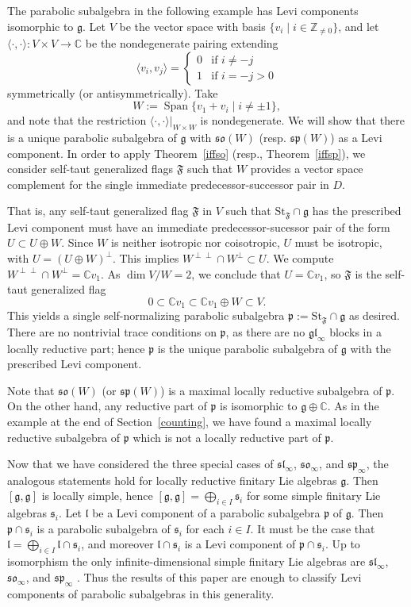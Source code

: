 \documentclass{amsart}
\theoremstyle{definition}
\theoremstyle{remark}
\numberwithin{equation}{section}
\newcommand {\Z} {\mathbb{Z}}
\newcommand {\C} {\mathbb{C}}
\newcommand {\St} {\mathrm{St}}
\def\gl{\mathfrak {gl}}
\def\g{\mathfrak {g}}
\def\l{\mathfrak {l}}
\def\p{\mathfrak {p}}
\def\sl{\mathfrak{sl}}
\def\so{\mathfrak{so}}
\def\sp{\mathfrak{sp}}
\def\s{\mathfrak{s}}
\def\F{\mathfrak{F}}
\newcommand {\Span}{\operatorname{Span}}
\begin{document}
The parabolic subalgebra in the following example has Levi components isomorphic to $\g$. 
Let $V$ be the vector space with basis $\{ v_i \mid  i \in \Z_{\neq 0} \}$, and let $\langle \cdot , \cdot \rangle : V \times V \rightarrow \C$ be the nondegenerate pairing extending
$$\langle v_i , v_j \rangle =
\begin{cases}
 0 & \textrm{if } i \neq -j \\
1 & \textrm{if }  i = -j > 0
\end{cases}$$
symmetrically (or antisymmetrically). Take $$W := \Span \{ v_1 + v_i \mid i \neq \pm 1 \},$$
and note that the restriction $\langle \cdot , \cdot \rangle |_{W \times W}$ is nondegenerate. 
We will show that there is a unique parabolic subalgebra of $\g$ with $\so(W)$ (resp. $\sp(W)$) as a Levi component.  In order to apply Theorem~\ref{iffso} (resp., Theorem~\ref{iffsp}), we consider self-taut generalized flags $\F$ such that $W$ provides a vector space complement for the single immediate predecessor-successor pair in $D$.

That is, any self-taut generalized flag $\F$ in $V$ such that $\St_\F \cap \g$ has the prescribed Levi component must have an immediate predecessor-sucessor pair of the form $U \subset U \oplus W$.  Since $W$ is neither isotropic nor coisotropic, $U$ must be isotropic, with $U = (U \oplus W)^\perp$.  This implies $W^{\perp \perp} \cap W^\perp \subset U$.  We compute $W^{\perp \perp} \cap W^\perp = \C v_1$.  As $\dim V / W = 2$, we conclude that $U = \C v_1$, so $\F$ is the self-taut generalized flag
$$0 \subset \C v_1 \subset \C v_1 \oplus W \subset V.$$ 
This yields a single self-normalizing parabolic subalgebra $\p := \St_\F \cap \g$ as desired.  There are no nontrivial trace conditions on $\p$, as there are no $\gl_\infty$ blocks in a locally reductive part; hence $\p$ is the unique parabolic subalgebra of $\g$ with the prescribed Levi component.  

Note that $\so(W)$ (or $\sp(W)$) is a maximal locally reductive subalgebra of $\p$.  On the other hand, any reductive part of $\p$ is isomorphic to $\g \oplus \C$.  As in the example at the end of Section~\ref{counting}, we have found a maximal locally reductive subalgebra of $\p$ which is not a locally reductive part of $\p$.

Now that we have considered the three special cases of $\sl_\infty$, $\so_\infty$, and $\sp_\infty$, the analogous statements hold for locally reductive finitary Lie algebras $\g$.  Then $[\g,\g]$ is locally simple, hence $[\g,\g] = \bigoplus_{i \in I} \s_i$ for some simple finitary Lie algebras $\s_i$.  Let $\l$ be a Levi component of a parabolic subalgebra $\p$ of $\g$.  Then $\p \cap \s_i$ is a parabolic subalgebra of $\s_i$ for each $i \in I$.  It must be the case that $\l = \bigoplus_{i \in I} \l \cap \s_i$, and moreover $\l \cap \s_i$ is a Levi component of $\p \cap \s_i$.  Up to isomorphism the only infinite-dimensional simple finitary Lie algebras are $\sl_\infty$, $\so_\infty$, and $\sp_\infty$ \cite{BaranovStrade}.  Thus the results of this paper are enough to classify Levi components of parabolic subalgebras in this generality.
\end{document}
